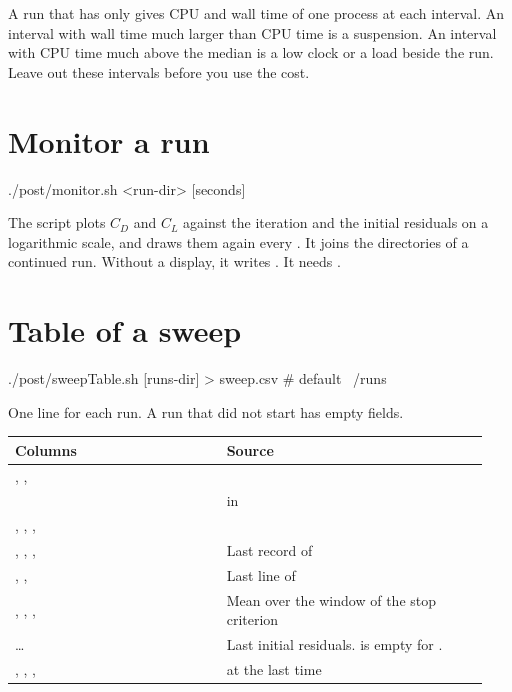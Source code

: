 A run that has only  gives CPU and wall time of one process at
each interval. An interval with wall time much larger than CPU time is a suspension.
An interval with CPU time much above the median is a low clock or a load beside the
run. Leave out these intervals before you use the cost.

\section{Monitor a run}\label{sec:monitor}

\begin{shell}
./post/monitor.sh <run-dir> [seconds]
\end{shell}

The script plots $C_D$ and $C_L$ against the iteration and the initial residuals on a
logarithmic scale, and draws them again every \val{[seconds]}. It joins the
directories of a continued run. Without a display, it writes
. It needs .

\section{Table of a sweep}\label{sec:sweeptable}

\begin{shell}
./post/sweepTable.sh [runs-dir] > sweep.csv    # default ~/runs
\end{shell}

One line for each run. A run that did not start has empty fields.

\begin{longtable}{@{}P{0.42\linewidth} P{0.52\linewidth}@{}}
\toprule
Columns & Source \\
\midrule
\endhead
{}, ,  &  \\
 &  in  \\
, , ,  &  \\
, , ,  & Last record of  \\
, ,  & Last line of  \\
, , ,  & Mean over the window of the stop criterion \\
 \ldots{}  & Last initial residuals.  is empty for . \\
, , ,  & \yplus{} at the last time \\
\bottomrule
\end{longtable}

